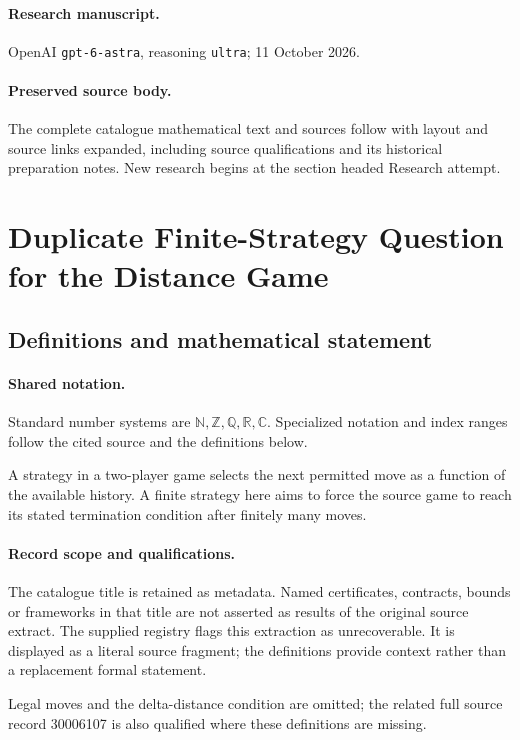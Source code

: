 \documentclass[11pt]{article}
\begin{document}
\paragraph{Research manuscript.} OpenAI \texttt{gpt-6-astra}, reasoning \texttt{ultra}; 11 October 2026.
\paragraph{Preserved source body.} The complete catalogue mathematical text and sources follow with layout and source links expanded, including source qualifications and its historical preparation notes. New research begins at the section headed Research attempt.

\section{Duplicate Finite-Strategy Question for the Distance Game}\label{statement}

\subsection{Definitions and mathematical statement}

\paragraph{Shared notation.}Standard number systems are $\mathbb N,\mathbb Z,\mathbb Q,\mathbb R,\mathbb C$. Specialized notation and index ranges follow the cited source and the definitions below.


A strategy in a two-player game selects the next permitted move as a function of the available history. A finite strategy here aims to force the source game to reach its stated termination condition after finitely many moves.
\paragraph{Record scope and qualifications.}
The catalogue title is retained as metadata. Named certificates, contracts, bounds or frameworks in that title are not asserted as results of the original source extract.
The supplied registry flags this extraction as unrecoverable. It is displayed as a literal source fragment; the definitions provide context rather than a replacement formal statement.

Legal moves and the delta-distance condition are omitted; the related full source record 30006107 is also qualified where these definitions are missing.
\end{document}
